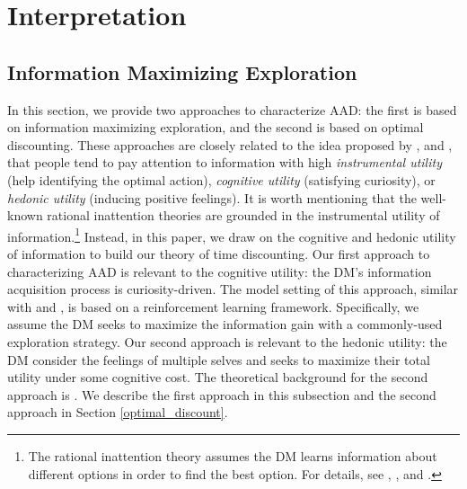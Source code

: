 \documentclass[
  12pt,
]{article}
\begin{document}
\hypertarget{interpretation}{%
\section{Interpretation}\label{interpretation}}

\hypertarget{information-maximizing-exploration}{%
\subsection{\texorpdfstring{Information Maximizing Exploration
\label{info_exploration}}{Information Maximizing Exploration }}\label{information-maximizing-exploration}}

In this section, we provide two approaches to characterize AAD: the
first is based on information maximizing exploration, and the second is
based on optimal discounting. These approaches are closely related to
the idea proposed by \citet{gottlieb2012attention},
\citet{gottlieb2013information} and \citet{sharot2020people}, that
people tend to pay attention to information with high \emph{instrumental
utility} (help identifying the optimal action), \emph{cognitive utility}
(satisfying curiosity), or \emph{hedonic utility} (inducing positive
feelings). It is worth mentioning that the well-known rational
inattention theories are grounded in the instrumental utility of
information.\footnote{The rational inattention theory assumes the DM
  learns information about different options in order to find the best
  option. For details, see \citet{sims2003implications},
  \citet{matvejka2015rational}, and \citet{mackowiak2023rational}.}
Instead, in this paper, we draw on the cognitive and hedonic utility of
information to build our theory of time discounting. Our first approach
to characterizing AAD is relevant to the cognitive utility: the DM's
information acquisition process is curiosity-driven. The model setting
of this approach, similar with \citet{gottlieb2012attention} and
\citet{gottlieb2013information}, is based on a reinforcement learning
framework. Specifically, we assume the DM seeks to maximize the
information gain with a commonly-used exploration strategy. Our second
approach is relevant to the hedonic utility: the DM consider the
feelings of multiple selves and seeks to maximize their total utility
under some cognitive cost. The theoretical background for the second
approach is \citet{noor2022optimal,noor2024constrained}. We describe the
first approach in this subsection and the second approach in Section
\ref{optimal_discount}.
\end{document}
